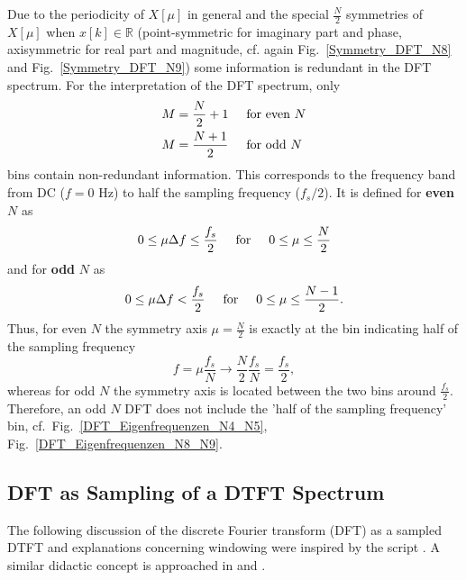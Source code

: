 \documentclass[11pt,a4paper,DIV=12]{scrartcl}
\begin{document}
%
Due to the periodicity of $X[\mu]$ in general and the special $\frac{N}{2}$
symmetries of $X[\mu]$ when $x[k]\in\mathbb{R}$
(point-symmetric for imaginary part and phase, axisymmetric for real part and
magnitude, cf. again Fig.~\ref{Symmetry_DFT_N8} and Fig.~\ref{Symmetry_DFT_N9})
some information is redundant in the DFT spectrum.
%
For the interpretation of the DFT spectrum, only
\begin{align}
M&=\frac{N}{2}+1 \hspace{5mm}\text{for even }N\nonumber\\
M&=\frac{N+1}{2} \hspace{5mm}\text{for odd }N
\end{align}
bins contain non-redundant information.
%
This corresponds to the frequency band from DC ($f=0$ Hz) to half the sampling
frequency ($f_s/2$).
%
It is defined for \textbf{even} $N$ as
\begin{equation}
0\leq\mu\Delta f\leq\frac{f_s}{2} \hspace{5mm}\text{for}\hspace{5mm} 0\leq\mu\leq\frac{N}{2}
\end{equation}
and for \textbf{odd} $N$ as
\begin{equation}
0\leq\mu\Delta f<\frac{f_s}{2} \hspace{5mm}\text{for}\hspace{5mm} 0\leq\mu\leq\frac{N-1}{2}.
\end{equation}
%
Thus, for even $N$ the symmetry axis $\mu=\frac{N}{2}$ is exactly at the bin
indicating half of the sampling frequency
%
\begin{equation}
f=\mu\frac{f_s}{N}\rightarrow\frac{N}{2}\frac{f_s}{N}=\frac{f_s}{2},
\end{equation}
%
whereas for odd $N$ the symmetry axis is located between the two bins around
$\frac{f_s}{2}$.
%
Therefore, an odd $N$ DFT does not include the 'half of the sampling frequency'
bin, cf.~Fig.~\ref{DFT_Eigenfrequenzen_N4_N5}, Fig.~\ref{DFT_Eigenfrequenzen_N8_N9}.

\subsection{DFT as Sampling of a DTFT Spectrum}
The following discussion of the discrete Fourier transform (DFT) as a sampled
DTFT and explanations concerning windowing were inspired by the
script \cite{Moeser2011}. A similar didactic concept
is approached in \cite[Ch.~7.3,~7.4]{Kammeyer2002} and \cite{Rabiner1975}.
\end{document}
